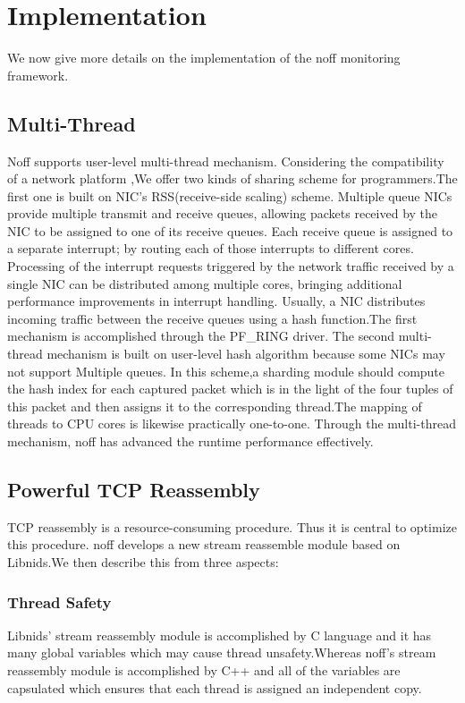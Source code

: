 \documentclass[conference]{IEEEtran}
\begin{document}
\section{Implementation}
We now give more details on the implementation of the noff monitoring framework.
\subsection{Multi-Thread}
Noff supports user-level multi-thread mechanism. Considering the compatibility of a network platform ,We offer two kinds of sharing scheme for programmers.The first one is built on NIC's RSS(receive-side scaling) scheme.
\newline\indent Multiple queue NICs provide multiple transmit and receive queues, allowing packets received by the NIC to be assigned to one of its receive queues. Each receive queue is assigned to a separate interrupt; by routing each of those interrupts to different cores. Processing of the interrupt requests triggered by the network traffic received by a single NIC can be distributed among multiple cores, bringing additional performance improvements in interrupt handling. Usually, a NIC distributes incoming traffic between the receive queues using a hash function.The first mechanism is accomplished through the PF\_RING driver.
\newline\indent The second multi-thread mechanism is built on user-level hash algorithm because some NICs may not support Multiple queues. In this scheme,a sharding module should compute the hash index for each captured packet which is in the light of the four tuples of this packet and then assigns it to the corresponding thread.The mapping of threads to CPU cores is likewise practically one-to-one.
\newline\indent Through the multi-thread mechanism, noff has advanced the runtime performance effectively.
\subsection{Powerful TCP Reassembly}
TCP reassembly is a resource-consuming procedure. Thus it is central to optimize this procedure. noff develops a new stream reassemble module based on Libnids.We then describe this from three aspects:
\subsubsection{Thread Safety}
Libnids' stream reassembly module is accomplished by C language and it has many global variables which may cause thread unsafety.Whereas noff's stream reassembly module is accomplished by C++ and all of the variables are capsulated which ensures that each thread is assigned an independent copy.
\end{document}
